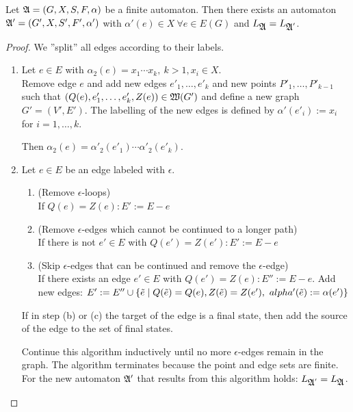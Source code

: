\begin{lemma}
Let $\mbox{$\mathfrak{A}$} = (G, X, S, F, \alpha)$ be a finite automaton. Then there
exists an automaton $\mbox{$\mathfrak{A'}$} = (G', X, S', F', \alpha')$ with $\alpha'(e)
\in X\ \forall e \in E(G)$ and $L_{\mbox{$\mathfrak{A}$}} = L_{\mbox{$\mathfrak{A}$}'}$.
\end{lemma}

\begin{proof}
We ''split'' all edges according to their labels.

\begin{enumerate}
  \item Let $e \in E$ with $\alpha_2(e) = x_1 \cdots x_k,\ k > 1, x_i \in X$.\\
  Remove edge $e$ and add new edges $e'_1,
  \ldots, e'_k$ and new points $P'_1, \ldots, P'_{k-1}$ such that $(Q(e),
  e'_1, \ldots, e'_k, Z(e)) \in \mbox{$\mathfrak{W}({G'})$}$ and define a new graph $G' =
  (V', E')$. The labelling of the new edges is defined by $\alpha'(e'_i) := x_i$
  for $i = 1, \ldots, k$.
  
  Then $\alpha_2(e) = \alpha'_2(e'_1) \cdots \alpha'_2(e'_k)$.
  
  \item Let $e \in E$ be an edge labeled with $\epsilon$.
  \begin{enumerate}
    \item  (Remove $\epsilon$-loops) \\
    If $Q(e) = Z(e) : E' := E - e$
    \item (Remove
    $\epsilon$-edges which cannot be continued to a longer path)\\
    If there is
    not $e' \in E$ with $Q(e') = Z(e') : E' := E - e$
    \item  (Skip $\epsilon$-edges that can be continued and remove the
    $\epsilon$-edge)\\
    If there exists an edge $e' \in E$ with $Q(e') = Z(e) : E'' := E - e$.
    Add new edges: $E' := E'' \cup \mbox{$\{\tilde{e} \mid Q(\tilde{e}) = Q(e), 
    Z(\tilde{e}) = Z(e'),\ alpha'(\tilde{e}) := \alpha(e')\}$}$
  \end{enumerate}
  If in step (b) or (c) the target of the edge is a final state, then add the
  source of the edge to the set of final states.
  
  Continue this algorithm inductively until no more $\epsilon$-edges remain in
  the graph. The algorithm terminates because the point and edge sets are
  finite. For the new automaton $\mbox{$\mathfrak{A'}$}$ that results from this algorithm
  holds: $L_{\mbox{$\mathfrak{A}$}'} = L_{\mbox{$\mathfrak{A}$}}$.
\end{enumerate}
\end{proof}

